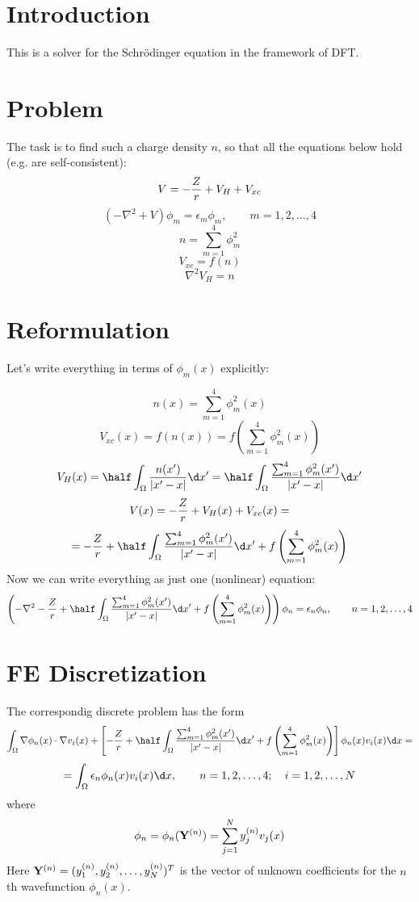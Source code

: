 \documentclass[11pt]{article}
\begin{document}
\section{Introduction}

This is a solver for the Schr\"odinger equation in the framework of DFT.

\section{Problem}

The task is to find such a charge density $n$, so that all the equations below hold (e.g. are
self-consistent):
$$ V = -{Z\over r} + V_H + V_{xc} $$
$$
\left(-\nabla^2+V\right)\phi_m = \epsilon_m\phi_m,\quad\quad m = 1, 2, \dots, 4
$$
$$ n = \sum_{m=1}^4 \phi_m^2 $$
$$ V_{xc} = f(n) $$
$$ \nabla^2 V_H = n $$

\section{Reformulation}

Let's write everything in terms of $\phi_m(x)$ explicitly:

$$n(x) = %
\sum_{m=1}^4 \phi_m^2(x)$$
$$V_{xc}(x) = f(n(x)) = f\left( \sum_{m=1}^4\phi_m^2(x) \right)$$
$$V_H(x) = \half \int_\Omega {n(x')\over|x' - x|}\d x'=
\half \int_\Omega {
\sum_{m=1}^4 \phi_m^2(x')
\over|x' - x|}\d x'
$$
$$V(x) = -{Z\over r} + V_H(x) + V_{xc}(x)=$$
$$
=-{Z\over r}+
\half \int_\Omega {
\sum_{m=1}^4 \phi_m^2(x')
\over|x' - x|}\d x'
+f\left( \sum_{m=1}^4\phi_m^2(x) \right)
$$
Now we can write everything as just one (nonlinear)
equation:
$$
\left(-\nabla^2
-{Z\over r}+
\half \int_\Omega {
\sum_{m=1}^4 \phi_m^2(x')
\over|x' - x|}\d x'
+f\left( \sum_{m=1}^4\phi_m^2(x) \right)
\right)\phi_n = \epsilon_n\phi_n,\quad\quad n = 1, 2, \dots, 4
$$

\section{FE Discretization}

The correspondig discrete problem has the form
$$
\int_\Omega \nabla\phi_n(x)\cdot\nabla v_i(x)+\left[
-{Z\over r}+
\half \int_\Omega {
\sum_{m=1}^4 \phi_m^2(x')
\over|x' - x|}\d x'
+f\left( \sum_{m=1}^4\phi_m^2(x) \right)
\right]
\phi_n(x) v_i(x)  \d x=
$$
$$
=\int_\Omega
\epsilon_n\phi_n(x) v_i(x) \d x,\quad\quad n = 1, 2, \dots, 4;\quad
i = 1, 2, \dots, N
$$
where
$$\phi_n = \phi_n({\bf Y}^{(n)}) = \sum_{j=1}^N y_j^{(n)} v_j(x)$$
Here ${\bf Y}^{(n)} = (y_1^{(n)}, y_2^{(n)}, \dots, y_N^{(n)})^T$ is the vector
of unknown coefficients for the $n$th wavefunction $\phi_n(x)$.
\end{document}
